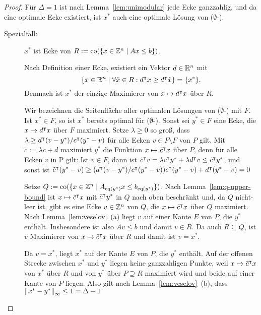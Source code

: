 \begin{proof}
	Für $\Delta=1$ ist nach Lemma~\ref{lem:unimodular} jede Ecke ganzzahlig, und da eine optimale Ecke existiert, ist $x^*$ auch eine optimale Lösung von ($\emptyset$-\MIPI).
		\begin{description}
		
		
		\item[Spezialfall:] $x^*$ ist Ecke von $R:=\operatorname{co}(\{ x\in\mathbb{Z}^n \mid Ax\leq b \})$.
		
		Nach Definition einer Ecke, existiert ein Vektor $d\in\mathbb{R}^n$ mit $$\{ x\in\mathbb{R}^n \mid \forall \tilde{x}\in R: d^\intercal x \geq d^\intercal\tilde{x} \}=\{x^*\}.$$
		Demnach ist $x^*$ der einzige Maximierer von $x\mapsto d^\intercal x$ über $R$.
		
		Wir bezeichnen die Seitenfläche aller optimalen Lösungen von ($\emptyset$-\MIPI) mit $F$.
		Ist $x^*\in F$, so ist $x^*$ bereits optimal für ($\emptyset$-\MIPI).
		Sonst sei $y^*\in F$ eine Ecke, die $x\mapsto d^\intercal x$ über $F$ maximiert.
		Setze $\lambda\geq 0$ so groß, dass $\lambda\geq d^\intercal (v-y^*)/c^\intercal (y^*-v)$ für alle Ecken $v\in P\setminus F$ von $P$ gilt.
		Mit $\tilde{c}:= \lambda c + d$ maximiert $y^*$ die Funktion $x\mapsto \tilde{c}^\intercal x$ über $P$, denn für alle Ecken $v$ in  P gilt: Ist $v\in F$, dann ist $\tilde{c}^\intercal v = \lambda c^\intercal y^* + \lambda d^\intercal v\leq \tilde{c}^\intercal y^*$, und sonst ist 
		$\tilde{c}^\intercal (y^*-v)\geq (d^\intercal (v-y^*)/c^\intercal(y^*-v))
		c^\intercal (y^*-v) + d^\intercal (y^*-v)=0$
		
		Setze $Q:=\operatorname{co}(\{x\in\mathbb{Z}^n \mid A_{\operatorname{eq}(y^*)}x \leq b_{\operatorname{eq}(y^*)} \})$.
		Nach Lemma~\ref{lem:q-upper-bound} ist $x\mapsto \tilde{c}^\intercal x$ mit $\tilde{c}^\intercal y^*$ in $Q$ nach oben beschränkt und, da $Q$ nicht-leer ist, gibt es eine Ecke $v\in\mathbb{Z}^n$ von $Q$, die $x\mapsto\tilde{c}^\intercal x$ über $Q$ maximiert.
		Nach Lemma~\ref{lem:veselov}~(a) liegt $v$ auf einer Kante $E$ von $P$, die $y^*$ enthält.
		Insbesondere ist also $Av\leq b$ und damit $v\in R$.
		Da auch $R \subseteq Q$, ist $v$ Maximierer von $x\mapsto \tilde{c}^\intercal x$ über $R$ und damit ist $v=x^*$.
		
		Da $v=x^*$, liegt $x^*$ auf der Kante $E$ von $P$, die $y^*$ enthält.
		Auf der offenen Strecke zwischen $x^*$ und $y^*$ liegen keine ganzzahligen Punkte, weil $x\mapsto \tilde{c}^\intercal x$ von $x^*$ über $R$ und von $y^*$ über $P\supseteq R$ maximiert wird und beide auf einer Kante von $P$ liegen.
		Also gilt nach Lemma~\ref{lem:veselov}~(b), dass $\left\lVert x^*-y^*\right\rVert_\infty\leq 1 = \Delta -1 $
		

\end{description}
\end{proof}
